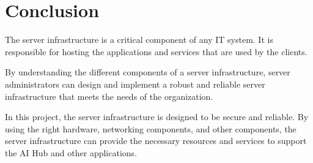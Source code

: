\cite{containerization} 

\section{Conclusion}

The server infrastructure is a critical component of any IT system. It is responsible for hosting the applications and services that are used by the clients.

By understanding the different components of a server infrastructure, server administrators can design and implement a robust and reliable server infrastructure that meets the needs of the organization.

In this project, the server infrastructure is designed to be secure and reliable. By using the right hardware, networking components, and other components, the server infrastructure can provide the necessary resources and services to support the AI Hub and other applications.
